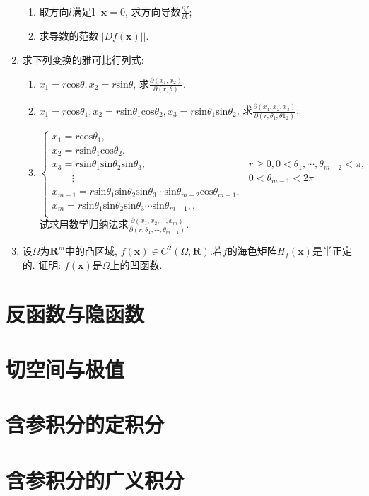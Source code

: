 \begin{enumerate}
\begin{enumerate}
	\item 取方向$l$满足$\bm{l}\cdot \bm{x}=0$, 求方向导数$\frac{\partial f}{\partial \bm{l}}$;
	\item 求导数的范数$||Df(\bm{x})||$.
\end{enumerate}
\item 求下列变换的雅可比行列式:
\begin{enumerate}
		\item $x_1=r\mathrm{cos}\theta, x_2=r\mathrm{sin}\theta$, 求$\frac{\partial (x_1,x_2)}{\partial (r,\theta)}$.
		\item $x_1=r\mathrm{cos}\theta_1, x_2=r\mathrm{sin}\theta_1\mathrm{cos}\theta_2, x_3=r\mathrm{sin}\theta_1\mathrm{sin}\theta_2$, 求$\frac{\partial (x_1,x_2,x_3)}{\partial{(r,\theta_1,\theta1_2)}}$;
		\item $
		\begin{cases}
		x_1 = r\mathrm{cos}\theta_1,&\qquad \\
		x_2 = r\mathrm{sin}\theta_1\mathrm{cos}\theta_2, &\qquad \\ 
		x_3 = r\mathrm{sin}\theta_1\mathrm{sin}\theta_2\mathrm{sin}\theta_3,& r\ge 0, 0<\theta_1,\cdots,\theta_{m-2}<\pi, \\
		\qquad \vdots \qquad&0<\theta_{m-1}<2\pi \\
		x_{m-1} = r\mathrm{sin}\theta_1\mathrm{sin}\theta_2\mathrm{sin}\theta_3\cdots\mathrm{sin}\theta_{m-2}\mathrm{cos}\theta_{m-1},&\qquad \\
		x_m = r\mathrm{sin}\theta_1\mathrm{sin}\theta_2\mathrm{sin}\theta_3\cdots\mathrm{sin}\theta_{m-1},,&\qquad \\
		\end{cases}
		$\\
		试求用数学归纳法求$\frac{\partial(x_1,x_2,\cdots,x_m)}{\partial (r,\theta_1,\cdots,\theta_{m-1})}$.
\end{enumerate}
\item 设$\Omega$为$\bm{R}^m$中的凸区域, $f(\bm{x})\in C^2(\Omega,\bm{R})$.若$f$的海色矩阵$H_f(\bm{x})$是半正定的. 证明: $f(\bm{x})$是$\Omega$上的凹函数.
\end{enumerate}

\section{反函数与隐函数}

\section{切空间与极值}

\section{含参积分的定积分}

\section{含参积分的广义积分}